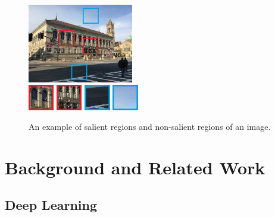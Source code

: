 \begin{figure}
\includegraphics[width=0.41\textwidth]{library}
\\[0.1cm]
\includegraphics[width=0.1\textwidth]{library_1}
\includegraphics[width=0.1\textwidth]{library_2}
\includegraphics[width=0.1\textwidth]{library_3}
\includegraphics[width=0.1\textwidth]{library_4}
\caption{An example of salient regions and non-salient regions of an image.}
\label{fig:library}
\end{figure}
\section{Background and Related Work}
\subsection{Deep Learning}
